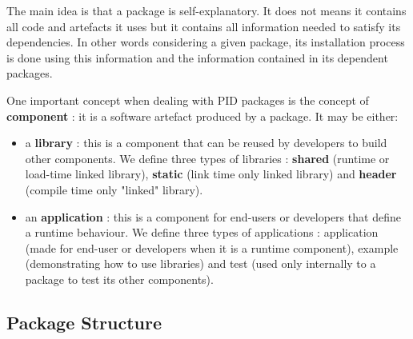 \documentclass[12pt,a4paper]{article}
\begin{document}
The main idea is that a package is self-explanatory. It does not means it contains all code and artefacts it uses but it contains all information needed to satisfy its dependencies. In other words considering a given package, its installation process is done using this information and the information contained in its dependent packages.

One important concept when dealing with PID packages is the concept of \textbf{component} : it is a software artefact produced  by a package. It may be either:
\begin{itemize}
\item a \textbf{library} : this is a component that can be reused by developers to build other components. We define three types of libraries : \textbf{shared} (runtime or load-time linked library), \textbf{static} (link time only linked library) and \textbf{header} (compile time only "linked" library).
\item an \textbf{application} : this is a component for end-users or developers that define a runtime behaviour. We define three types of applications : application (made for end-user or developers when it is a runtime component), example (demonstrating how to use libraries) and test (used only internally to a package to test its other components).
\end{itemize}

\pagebreak

\subsection{Package Structure}
\label{sec:PackageStruct}
\end{document}
